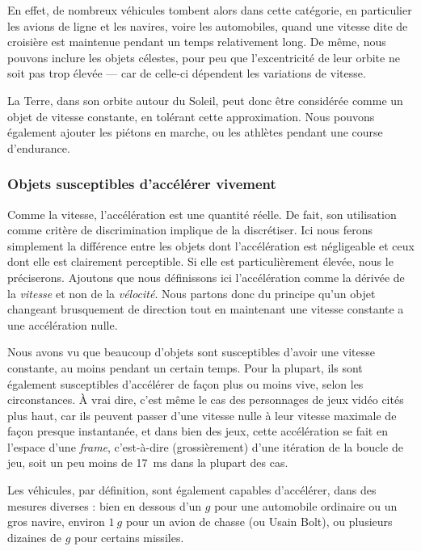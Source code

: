 	En effet, de nombreux véhicules tombent alors dans cette catégorie, en particulier les avions de ligne et les navires, voire les automobiles, quand une vitesse dite de croisière est maintenue pendant un temps relativement long. De même, nous pouvons inclure les objets célestes, pour peu que l'excentricité de leur orbite ne soit pas trop élevée --- car de celle-ci dépendent les variations de vitesse.
	
	La Terre, dans son orbite autour du Soleil, peut donc être considérée comme un objet de vitesse constante, en tolérant cette approximation. Nous pouvons également ajouter les piétons en marche, ou les athlètes pendant une course d'endurance.
	
	\subsubsection{Objets susceptibles d'accélérer vivement}
	Comme la vitesse, l'accélération est une quantité réelle. De fait, son utilisation comme critère de discrimination implique de la discrétiser. Ici nous ferons simplement la différence entre les objets dont l'accélération est négligeable et ceux dont elle est clairement perceptible. Si elle est particulièrement élevée, nous le préciserons. Ajoutons que nous définissons ici l'accélération comme la dérivée de la \emph{vitesse} et non de la \emph{vélocité}. Nous partons donc du principe qu'un objet changeant brusquement de direction tout en maintenant une vitesse constante a une \og accélération \fg{} nulle.
	
	Nous avons vu que beaucoup d'objets sont susceptibles d'avoir une vitesse constante, au moins pendant un certain temps. Pour la plupart, ils sont également susceptibles d'accélérer de façon plus ou moins vive, selon les circonstances. À vrai dire, c'est même le cas des personnages de jeux vidéo cités plus haut, car ils peuvent passer d'une vitesse nulle à leur vitesse maximale de façon presque instantanée, et dans bien des jeux, cette accélération se fait en l'espace d'une \emph{frame}, c'est-à-dire (grossièrement) d'une itération de la boucle de jeu, soit un peu moins de 17~ms dans la plupart des cas.
	
	Les véhicules, par définition, sont également capables d'accélérer, dans des mesures diverses : bien en dessous d'un $g$ pour une automobile ordinaire ou un gros navire, environ $1~g$ pour un avion de chasse (ou Usain Bolt\footnotemark{}), ou plusieurs dizaines de $g$ pour certains missiles\footnotemark{}.
	
